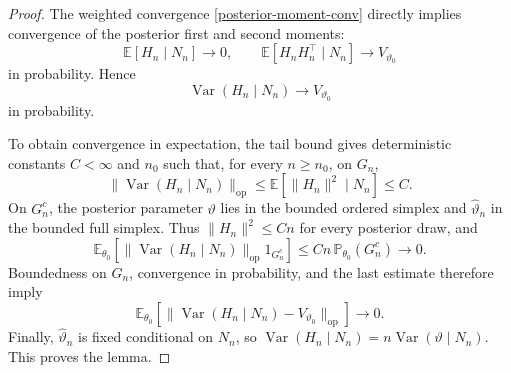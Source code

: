 \documentclass[10pt,a4paper]{amsart}
\theoremstyle{named}
\theoremstyle{named1}
\theoremstyle{plain}
\theoremstyle{remark}
\begin{document}
\begin{proof}
The weighted convergence \eqref{posterior-moment-conv} directly implies
convergence of the posterior first and second moments:
\[
    \mathbb E[H_n\mid N_n]\rightarrow0,
    \qquad
    \mathbb E[H_nH_n^\top\mid N_n]\rightarrow V_{\vartheta_0}
\]
in probability. Hence
\begin{equation}
    \operatorname{Var}(H_n\mid N_n)
    \rightarrow V_{\vartheta_0}
    \label{eq:posterior-covariance-probability}
\end{equation}
in probability.

To obtain convergence in expectation, the tail bound gives deterministic
constants $C<\infty$ and $n_0$ such that, for every $n\geq n_0$, on $G_n$,
\[
    \|\operatorname{Var}(H_n\mid N_n)\|_{\mathrm{op}}
    \leq\mathbb E[\|H_n\|^2\mid N_n]\leq C.
\]
On $G_n^c$, the posterior parameter $\vartheta$ lies in the bounded
ordered simplex and $\widehat\vartheta_n$ in the bounded full simplex.
Thus $\|H_n\|^2\leq Cn$ for every posterior draw, and
\[
    \mathbb E_{\theta_0}\left[
        \|\operatorname{Var}(H_n\mid N_n)\|_{\mathrm{op}}
        1_{G_n^c}
    \right]
    \leq Cn\,\mathbb P_{\theta_0}(G_n^c)
    \rightarrow0.
\]
Boundedness on $G_n$, convergence in probability, and the last estimate
therefore imply
\[
    \mathbb E_{\theta_0}\left[
        \|\operatorname{Var}(H_n\mid N_n)-V_{\vartheta_0}\|_{\mathrm{op}}
    \right]\rightarrow0.
\]
Finally, $\widehat\vartheta_n$ is fixed conditional on $N_n$, so
$\operatorname{Var}(H_n\mid N_n)=n\operatorname{Var}(\vartheta\mid N_n)$.
This proves the lemma.
\end{proof}
\end{document}
